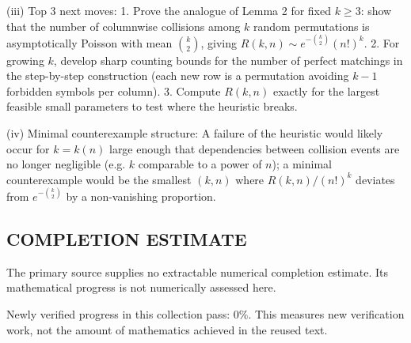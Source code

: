 (iii) Top 3 next moves:
  1. Prove the analogue of Lemma 2 for fixed $k\ge 3$: show that the number of columnwise collisions among $k$ random permutations is asymptotically Poisson with mean $\binom{k}{2}$, giving $R(k,n)\sim e^{-\binom{k}{2}}(n!)^k$.
  2. For growing $k$, develop sharp counting bounds for the number of perfect matchings in the step-by-step construction (each new row is a permutation avoiding $k-1$ forbidden symbols per column).
  3. Compute $R(k,n)$ exactly for the largest feasible small parameters to test where the heuristic breaks.

(iv) Minimal counterexample structure: A failure of the heuristic would likely occur for $k=k(n)$ large enough that dependencies between collision events are no longer negligible (e.g. $k$ comparable to a power of $n$); a minimal counterexample would be the smallest $(k,n)$ where $R(k,n)/(n!)^k$ deviates from $e^{-\binom{k}{2}}$ by a non-vanishing proportion.




\subsection*{COMPLETION ESTIMATE}
The primary source supplies no extractable numerical completion estimate. Its mathematical progress is not numerically assessed here.

Newly verified progress in this collection pass: $0\%$. This measures new verification work, not the amount of mathematics achieved in the reused text.
